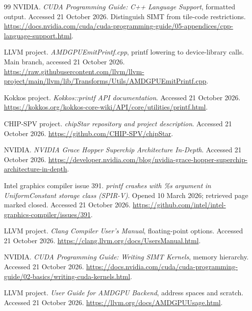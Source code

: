 \documentclass[11pt,letterpaper]{article}
\begin{document}
\begin{thebibliography}{99}
NVIDIA. \emph{CUDA Programming Guide: C++ Language Support}, formatted output.
Accessed 21 October 2026. Distinguish SIMT from tile-code restrictions.
\url{https://docs.nvidia.com/cuda/cuda-programming-guide/05-appendices/cpp-language-support.html}.

LLVM project. \emph{AMDGPUEmitPrintf.cpp}, printf lowering to device-library calls.
Main branch, accessed 21 October 2026.
\url{https://raw.githubusercontent.com/llvm/llvm-project/main/llvm/lib/Transforms/Utils/AMDGPUEmitPrintf.cpp}.

Kokkos project. \emph{Kokkos::printf API documentation}.
Accessed 21 October 2026.
\url{https://kokkos.org/kokkos-core-wiki/API/core/utilities/printf.html}.

CHIP-SPV project. \emph{chipStar repository and project description}.
Accessed 21 October 2026.
\url{https://github.com/CHIP-SPV/chipStar}.

NVIDIA. \emph{NVIDIA Grace Hopper Superchip Architecture In-Depth}.
Accessed 21 October 2026.
\url{https://developer.nvidia.com/blog/nvidia-grace-hopper-superchip-architecture-in-depth}.

Intel graphics compiler issue 391.
\emph{printf crashes with \%s argument in UniformConstant storage class (SPIR-V)}.
Opened 10 March 2026; retrieved page marked closed. Accessed 21 October 2026.
\url{https://github.com/intel/intel-graphics-compiler/issues/391}.

LLVM project. \emph{Clang Compiler User's Manual}, floating-point options.
Accessed 21 October 2026.
\url{https://clang.llvm.org/docs/UsersManual.html}.

NVIDIA. \emph{CUDA Programming Guide: Writing SIMT Kernels}, memory hierarchy.
Accessed 21 October 2026.
\url{https://docs.nvidia.com/cuda/cuda-programming-guide/02-basics/writing-cuda-kernels.html}.

LLVM project. \emph{User Guide for AMDGPU Backend}, address spaces and scratch.
Accessed 21 October 2026.
\url{https://llvm.org/docs/AMDGPUUsage.html}.

\end{thebibliography}
\end{document}
